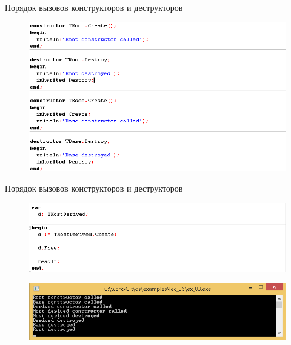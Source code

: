 \documentclass{beamer}
\begin{document}
\begin{frame}{Порядок вызовов конструкторов и деструкторов}
\begin{figure}[h]
\centering
\includegraphics[scale=0.5]{images/lec06-pic29.png}
\end{figure}
\end{frame}

\begin{frame}{Порядок вызовов конструкторов и деструкторов}
\begin{figure}[h]
\centering
\includegraphics[scale=0.5]{images/lec06-pic30.png}
\end{figure}
\begin{figure}[h]
\centering
\includegraphics[scale=0.5]{images/lec06-pic31.png}
\end{figure}
\end{frame}
\end{document}
